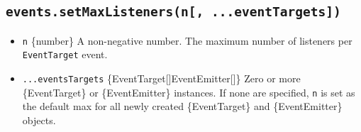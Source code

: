 \subsection{\texorpdfstring{\texttt{events.setMaxListeners(n{[},\ ...eventTargets{]})}}{events.setMaxListeners(n{[}, ...eventTargets{]})}}\label{events.setmaxlistenersn-...eventtargets}

\begin{itemize}
\tightlist
\item
  \texttt{n} \{number\} A non-negative number. The maximum number of
  listeners per \texttt{EventTarget} event.
\item
  \texttt{...eventsTargets}
  \{EventTarget{[}{]}\textbar EventEmitter{[}{]}\} Zero or more
  \{EventTarget\} or \{EventEmitter\} instances. If none are specified,
  \texttt{n} is set as the default max for all newly created
  \{EventTarget\} and \{EventEmitter\} objects.
\end{itemize}

\begin{Shaded}
\begin{Highlighting}[]
\OperatorTok{,} \NormalTok{ \} } \OperatorTok{;}

\OperatorTok{=}  \NormalTok{()}\OperatorTok{;}
\OperatorTok{=}  \NormalTok{()}\OperatorTok{;}

\NormalTok{(}\OperatorTok{,}\OperatorTok{,}\OperatorTok{;}
\end{Highlighting}
\end{Shaded}

\begin{Shaded}
\begin{Highlighting}[]
\NormalTok{ \{}
\OperatorTok{,}
  \OperatorTok{,}
\NormalTok{\} }\OperatorTok{=} \NormalTok{(}\NormalTok{)}\OperatorTok{;}

\OperatorTok{=}  \NormalTok{()}\OperatorTok{;}
\OperatorTok{=}  \NormalTok{()}\OperatorTok{;}

\NormalTok{(}\OperatorTok{,}\OperatorTok{,}\OperatorTok{;}
\end{Highlighting}
\end{Shaded}

